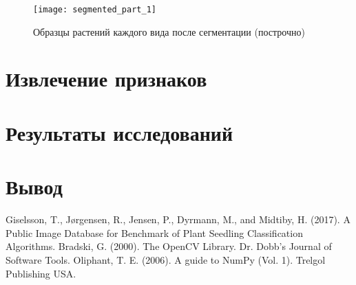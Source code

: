 \documentclass[12pt]{article}
\begin{document}
\begin{figure}[h]
	\centering
	\texttt{[image: segmented\_part\_1]}
	\caption{Образцы растений каждого вида после сегментации (построчно)}
	\label{fig_4}
\end{figure}


\section{Извлечение признаков}

\section{Результаты исследований}

\section{Вывод}

\newpage

\begin{thebibliography}{}
	 Giselsson, T., Jørgensen, R., Jensen, P., Dyrmann, M., and Midtiby, H. (2017). A Public Image Database for Benchmark of Plant Seedling Classification Algorithms. 
	 Bradski, G. (2000). The OpenCV Library. Dr. Dobb's Journal of Software Tools.
	 Oliphant, T. E. (2006). A guide to NumPy (Vol. 1). Trelgol Publishing USA.
\end{thebibliography}
\end{document}
